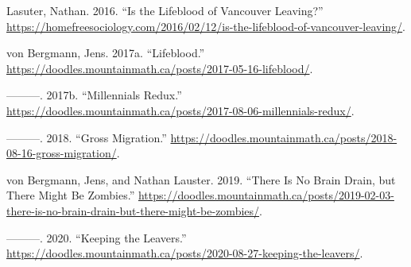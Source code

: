 \documentclass[
  letterpaper,
]{article}
\newlength{\cslhangindent}
\newenvironment{CSLReferences}[2] %
 {\begin{list}{}{%
  \setlength{\itemindent}{0pt}
  \setlength{\leftmargin}{0pt}
  \setlength{\parsep}{0pt}
  \ifodd #1
   \setlength{\leftmargin}{\cslhangindent}
   \setlength{\itemindent}{-1\cslhangindent}
  \fi
  \setlength{\itemsep}{#2\baselineskip}}}
 {\end{list}}
\begin{document}
\label{refs}
\begin{CSLReferences}{1}{0}
Lasuter, Nathan. 2016. {``Is the Lifeblood of Vancouver Leaving?''}
\url{https://homefreesociology.com/2016/02/12/is-the-lifeblood-of-vancouver-leaving/}.

von Bergmann, Jens. 2017a. {``Lifeblood.''}
\url{https://doodles.mountainmath.ca/posts/2017-05-16-lifeblood/}.

---------. 2017b. {``Millennials {Redux}.''}
\url{https://doodles.mountainmath.ca/posts/2017-08-06-millennials-redux/}.

---------. 2018. {``Gross Migration.''}
\url{https://doodles.mountainmath.ca/posts/2018-08-16-gross-migration/}.

von Bergmann, Jens, and Nathan Lauster. 2019. {``There Is No {Brain}
{Drain,} but There Might Be {Zombies}.''}
\url{https://doodles.mountainmath.ca/posts/2019-02-03-there-is-no-brain-drain-but-there-might-be-zombies/}.

---------. 2020. {``Keeping the {Leavers}.''}
\url{https://doodles.mountainmath.ca/posts/2020-08-27-keeping-the-leavers/}.

\end{CSLReferences}
\end{document}

